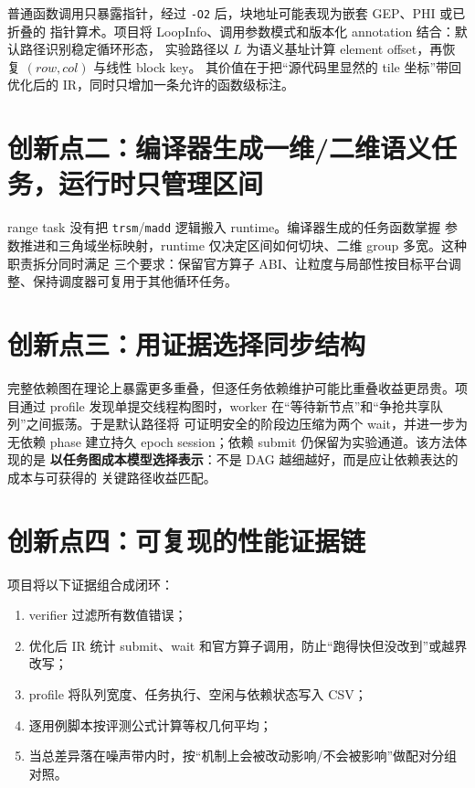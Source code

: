 \documentclass[UTF8,a4paper,openany,11pt,fontset=fandol]{ctexrep}
\begin{document}
普通函数调用只暴露指针，经过 \texttt{-O2} 后，块地址可能表现为嵌套 GEP、PHI 或已折叠的
指针算术。项目将 LoopInfo、调用参数模式和版本化 annotation 结合：默认路径识别稳定循环形态，
实验路径以 \(L\) 为语义基址计算 element offset，再恢复 \((row,col)\) 与线性 block key。
其价值在于把“源代码里显然的 tile 坐标”带回优化后的 IR，同时只增加一条允许的函数级标注。

\section{创新点二：编译器生成一维/二维语义任务，运行时只管理区间}

range task 没有把 \texttt{trsm}/\texttt{madd} 逻辑搬入 runtime。编译器生成的任务函数掌握
参数推进和三角域坐标映射，runtime 仅决定区间如何切块、二维 group 多宽。这种职责拆分同时满足
三个要求：保留官方算子 ABI、让粒度与局部性按目标平台调整、保持调度器可复用于其他循环任务。

\section{创新点三：用证据选择同步结构}

完整依赖图在理论上暴露更多重叠，但逐任务依赖维护可能比重叠收益更昂贵。项目通过 profile
发现单提交线程构图时，worker 在“等待新节点”和“争抢共享队列”之间振荡。于是默认路径将
可证明安全的阶段边压缩为两个 wait，并进一步为无依赖 phase 建立持久 epoch session；依赖 submit
仍保留为实验通道。该方法体现的是
\textbf{以任务图成本模型选择表示}：不是 DAG 越细越好，而是应让依赖表达的成本与可获得的
关键路径收益匹配。

\section{创新点四：可复现的性能证据链}

项目将以下证据组合成闭环：

\begin{enumerate}
  \item verifier 过滤所有数值错误；
  \item 优化后 IR 统计 submit、wait 和官方算子调用，防止“跑得快但没改到”或越界改写；
  \item profile 将队列宽度、任务执行、空闲与依赖状态写入 CSV；
  \item 逐用例脚本按评测公式计算等权几何平均；
  \item 当总差异落在噪声带内时，按“机制上会被改动影响/不会被影响”做配对分组对照。
\end{enumerate}
\end{document}
